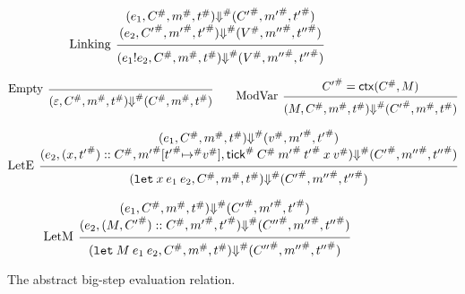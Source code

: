 \documentclass[acmsmall,review]{acmart}\settopmatter{printfolios=true,printccs=false,printacmref=false}
\theoremstyle{definition}
\newcommand*{\cons}{::}
\newcommand*{\A}[1]{{#1}^{\#}}
\newcommand*{\mem}{m}
\newcommand*{\link}[2]{{#1}\mathtt{!}{#2}}
\newcommand*{\tick}{\mathsf{tick}}
\newcommand*{\modctx}{\mathsf{ctx}}
\begin{document}
\begin{figure}[h!]
  \[
    \begin{prooftree}
      \hypo{
        \begin{matrix}
          (e_{1}, \A{C}, \A{\mem}, \A{t})
          \A{\Downarrow}
          (\A{C'}, \A{\mem'}, \A{t'}) \\
          (e_{2}, \A{C'}, \A{\mem'}, \A{t'})
          \A{\Downarrow}
          (\A{V}, \A{\mem''}, \A{t''})
        \end{matrix}
      }
      \infer[left label=Linking]1{
      (\link{e_{1}}{e_{2}}, \A{C}, \A{\mem}, \A{t})
      \A\Downarrow
      (\A{V}, \A{\mem''}, \A{t''})
      }
    \end{prooftree}
  \]

  \[
    \begin{prooftree}
      \infer[left label=Empty]0{
      (\varepsilon, \A{C}, \A{\mem}, \A{t})
      \A{\Downarrow}
      (\A{C}, \A{\mem}, \A{t})
      }
    \end{prooftree}\qquad
    \begin{prooftree}
      \hypo{\A{C'}=\modctx(\A{C},M)}
      \infer[left label=ModVar]1{
      (M, \A{C}, \A{\mem}, \A{t})
      \A{\Downarrow}
      (\A{C'}, \A{\mem}, \A{t})
      }
    \end{prooftree}
  \]

  \[
    \begin{prooftree}
      \hypo{
        \begin{matrix}
          (e_{1}, \A{C}, \A{\mem}, \A{t})
          \A\Downarrow
          (\A{v}, \A{\mem'}, \A{t'}) \\
          (e_{2}, (x, \A{t'})\cons \A{C}, \A{\mem'}[\A{t'}\A{\mapsto} \A{v}], \A{\tick}\:\A{C}\:\A{\mem'}\:\A{t'}\:x\:\A{v})
          \A\Downarrow
          (\A{C'}, \A{\mem''}, \A{t''})
        \end{matrix}
      }
      \infer[left label=LetE]1{
      (\mathtt{let}\:x\:e_1\:e_2, \A{C}, \A{\mem}, \A{t})
      \A\Downarrow
      (\A{C'}, \A{\mem''}, \A{t''})
      }
    \end{prooftree}
  \]

  \[
    \begin{prooftree}
      \hypo{
        \begin{matrix}
          (e_{1}, \A{C}, \A{\mem}, \A{t})
          \A\Downarrow
          (\A{C'}, \A{\mem'}, \A{t'}) \\
          (e_{2}, (M, \A{C'})\cons\A{C}, \A{\mem'}, \A{t'})
          \A\Downarrow
          (\A{C''}, \A{\mem''}, \A{t''})
        \end{matrix}
      }
      \infer[left label=LetM]1{
      (\mathtt{let}\:M\:e_{1}\:e_{2}, \A{C}, \A{\mem}, \A{t})
      \A\Downarrow
      (\A{C''}, \A{\mem''}, \A{t''})
      }
    \end{prooftree}
  \]
  \caption{The abstract big-step evaluation relation.}
  \label{fig:abseval}
\end{figure}
\end{document}
